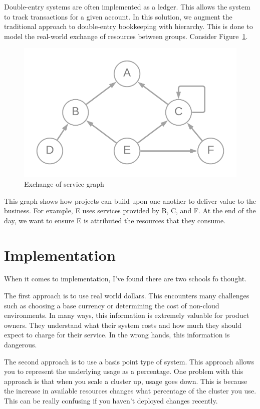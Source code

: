 \documentclass[10pt, a4paper, twocolumn]{article}
\begin{document}
    Double-entry systems are often implemented as a ledger.
    This allows the system to track transactions for a given account.
    In this solution, we augment the traditional approach to double-entry bookkeeping with hierarchy.
    This is done to model the real-world exchange of resources between groups.
    Consider Figure~\ref{figure:2}.

    \begin{figure}[H]
      \centering
      \includegraphics[width=\linewidth]{./truth-and-reconciliation-graph.png}
      \caption{Exchange of service graph}
      \label{figure:2}
    \end{figure}

    This graph shows how projects can build upon one another to deliver value to the business.
    For example, E uses services provided by B, C, and F.
    At the end of the day, we want to ensure E is attributed the resources that they consume.

\section*{Implementation}
  When it comes to implementation, I've found there are two schools fo thought.

  The first approach is to use real world dollars.
  This encounters many challenges such as choosing a base currency or determining the cost of non-cloud environments.
  In many ways, this information is extremely valuable for product owners.
  They understand what their system costs and how much they should expect to charge for their service.
  In the wrong hands, this information is dangerous.

  The second approach is to use a basis point type of system.
  This approach allows you to represent the underlying usage as a percentage.
  One problem with this approach is that when you scale a cluster up, usage goes down.
  This is because the increase in available resources changes what percentage of the cluster you use.
  This can be really confusing if you haven't deployed changes recently.
\end{document}
